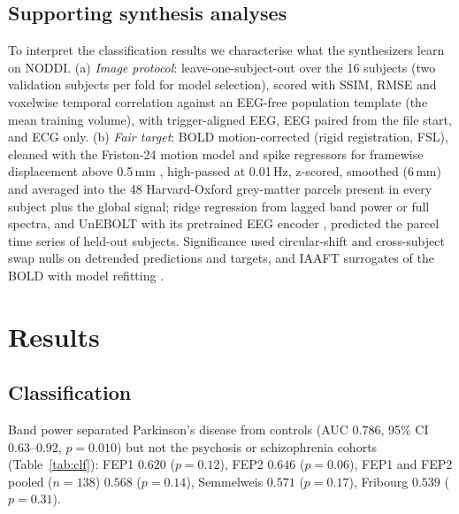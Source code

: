 \documentclass{article}
\begin{document}
\subsection{Supporting synthesis analyses}\label{setting:fidelity}

To interpret the classification results we characterise what the synthesizers learn on NODDI. (a) \emph{Image protocol}: leave-one-subject-out over the 16 subjects (two validation subjects per fold for model selection), scored with SSIM, RMSE and voxelwise temporal correlation against an EEG-free population template (the mean training volume), with trigger-aligned EEG, EEG paired from the file start, and ECG only. (b) \emph{Fair target}: BOLD motion-corrected (rigid registration, FSL), cleaned with the Friston-24 motion model and spike regressors for framewise displacement above 0.5\,mm \cite{friston1996,power2014}, high-passed at 0.01\,Hz, z-scored, smoothed (6\,mm) and averaged into the 48 Harvard-Oxford grey-matter parcels present in every subject plus the global signal; ridge regression from lagged band power or full spectra, and UnEBOLT \cite{li2026unebolt} with its pretrained EEG encoder \cite{jiang2024labram}, predicted the parcel time series of held-out subjects. Significance used circular-shift and cross-subject swap nulls on detrended predictions and targets, and IAAFT surrogates of the BOLD with model refitting \cite{schreiber1996,mehta2025time}.

\section{Results}\label{section:results}

\subsection{Classification}\label{section:res_clf}

Band power separated Parkinson's disease from controls (AUC $0.786$, 95\% CI $0.63$--$0.92$, $p=0.010$) but not the psychosis or schizophrenia cohorts (Table~\ref{tab:clf}): FEP1 $0.620$ ($p=0.12$), FEP2 $0.646$ ($p=0.06$), FEP1 and FEP2 pooled ($n=138$) $0.568$ ($p=0.14$), Semmelweis $0.571$ ($p=0.17$), Fribourg $0.539$ ($p=0.31$).
\end{document}
